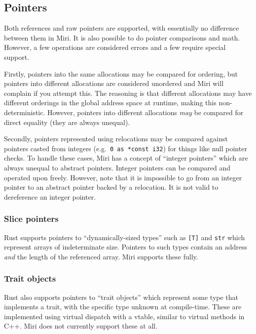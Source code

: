 \documentclass[twocolumn]{article}
\newcommand{\rust}[1]{\texttt{#1}}
\begin{document}
\subsection{Pointers}

Both references and raw pointers are supported, with essentially no difference between them in Miri.
It is also possible to do pointer comparisons and math. However, a few operations are considered
errors and a few require special support.

Firstly, pointers into the same allocations may be compared for ordering, but pointers into
different allocations are considered unordered and Miri will complain if you attempt this. The
reasoning is that different allocations may have different orderings in the global address space at
runtime, making this non-deterministic. However, pointers into different allocations \emph{may} be
compared for direct equality (they are always unequal).

Secondly, pointers represented using relocations may be compared against pointers casted from
integers (e.g.\ \rust{0 as *const i32}) for things like null pointer checks. To handle these cases,
Miri has a concept of ``integer pointers'' which are always unequal to abstract pointers. Integer
pointers can be compared and operated upon freely. However, note that it is impossible to go from an
integer pointer to an abstract pointer backed by a relocation. It is not valid to dereference an
integer pointer.

\subsubsection{Slice pointers}

Rust supports pointers to ``dynamically-sized types'' such as \rust{[T]} and \rust{str} which
represent arrays of indeterminate size. Pointers to such types contain an address \emph{and} the
length of the referenced array. Miri supports these fully.

\subsubsection{Trait objects}

Rust also supports pointers to ``trait objects'' which represent some type that implements a trait,
with the specific type unknown at compile-time. These are implemented using virtual dispatch with a
vtable, similar to virtual methods in C++. Miri does not currently support these at all.
\end{document}
